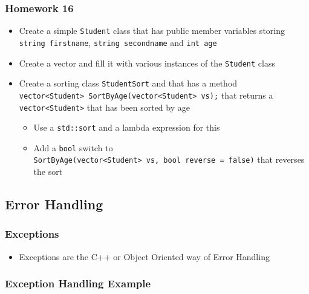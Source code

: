 \hypertarget{homework-16}{%
\subsubsection{Homework 16}\label{homework-16}}

\begin{itemize}
\tightlist
\item
  Create a simple \texttt{Student} class that has public member
  variables storing \texttt{string\ firstname},
  \texttt{string\ secondname} and \texttt{int\ age}
\item
  Create a vector and fill it with various instances of the
  \texttt{Student} class
\item
  Create a sorting class \texttt{StudentSort} and that has a method
  \texttt{vector\textless{}Student\textgreater{}\ SortByAge(vector\textless{}Student\textgreater{}\ vs);}
  that returns a \texttt{vector\textless{}Student\textgreater{}} that
  has been sorted by age

  \begin{itemize}
  \tightlist
  \item
    Use a \texttt{std::sort} and a lambda expression for this
  \item
    Add a \texttt{bool} switch to
    \texttt{SortByAge(vector\textless{}Student\textgreater{}\ vs,\ bool\ reverse\ =\ false)}
    that reverses the sort
  \end{itemize}
\end{itemize}

\hypertarget{error-handling}{%
\subsection{Error Handling}\label{error-handling}}

\hypertarget{exceptions}{%
\subsubsection{Exceptions}\label{exceptions}}

\begin{itemize}
\tightlist
\item
  Exceptions are the C++ or Object Oriented way of Error Handling
\end{itemize}

\hypertarget{exception-handling-example}{%
\subsubsection{Exception Handling
Example}\label{exception-handling-example}}

